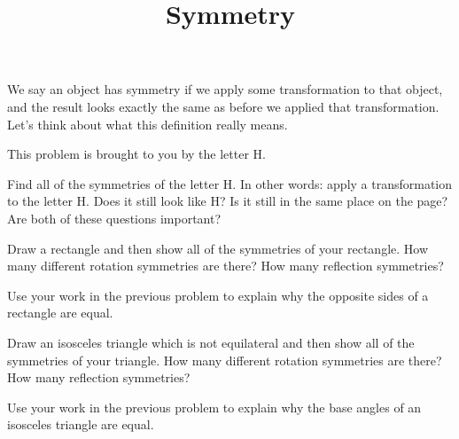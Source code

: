 \documentclass[nooutcomes, noauthor, handout]{ximera}
\title{Symmetry}
\begin{document}
\begin{abstract}

\end{abstract}
\maketitle

We say an object has symmetry if we apply some transformation to that object, and the result looks exactly the same as before we applied that transformation.  Let's think about what this definition really means.



\begin{problem}
This problem is brought to you by the letter H.
\begin{image}
\end{image}
Find all of the symmetries of the letter H.  In other words: apply a transformation to the letter H.  Does it still look like H?  Is it still in the same place on the page?  Are both of these questions important?

\end{problem}



\begin{problem}
Draw a rectangle and then show all of the symmetries of your rectangle. How many different rotation symmetries are there? How many reflection symmetries?
\end{problem}



\begin{problem}
Use your work in the previous problem to explain why the opposite sides of a rectangle are equal.
\end{problem}




\begin{problem}
Draw an isosceles triangle which is not equilateral and then show all of the symmetries of your triangle. How many different rotation symmetries are there? How many reflection symmetries?
\end{problem}


\begin{problem}
Use your work in the previous problem to explain why the base angles of an isosceles triangle are equal.
\end{problem}
\end{document}

